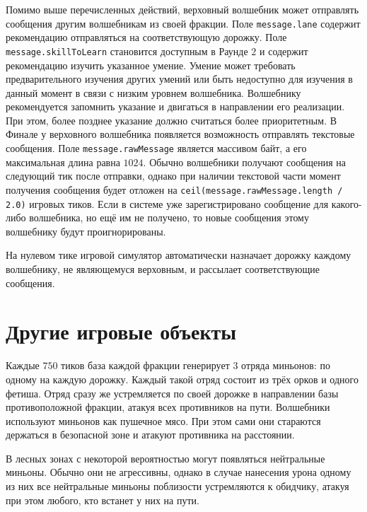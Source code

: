 
Помимо выше перечисленных действий, верховный волшебник может отправлять сообщения другим волшебникам из своей фракции. Поле
\texttt{message.lane} содержит рекомендацию отправляться на соответствующую дорожку. Поле \texttt{message.skillToLearn} становится доступным
в Раунде $2$ и содержит рекомендацию изучить указанное умение. Умение может требовать предварительного изучения других умений или быть
недоступно для изучения в данный момент в связи с низким уровнем волшебника. Волшебнику рекомендуется запомнить указание и двигаться в
направлении его реализации. При этом, более позднее указание должно считаться более приоритетным. В Финале у верховного волшебника
появляется возможность отправлять текстовые сообщения. Поле \texttt{message.rawMessage} является массивом байт, а его максимальная длина
равна $1024$. Обычно волшебники получают сообщения на следующий тик после отправки, однако при наличии текстовой части момент получения
сообщения будет отложен на \texttt{ceil(message.rawMessage.length / 2.0)} игровых тиков. Если в системе уже зарегистрировано сообщение для
какого-либо волшебника, но ещё им не получено, то новые сообщения этому волшебнику будут проигнорированы.

На нулевом тике игровой симулятор автоматически назначает дорожку каждому волшебнику, не являющемуся верховным, и рассылает соответствующие
сообщения.

\section{Другие игровые объекты}

Каждые $750$ тиков база каждой фракции генерирует $3$ отряда миньонов: по одному на каждую дорожку. Каждый такой отряд состоит из трёх орков
и одного фетиша. Отряд сразу же устремляется по своей дорожке в направлении базы противоположной фракции, атакуя всех противников на пути.
Волшебники используют миньонов как пушечное мясо. При этом сами они стараются держаться в безопасной зоне и атакуют противника на
расстоянии.

В лесных зонах с некоторой вероятностью могут появляться нейтральные миньоны. Обычно они не агрессивны, однако в случае нанесения урона
одному из них все нейтральные миньоны поблизости устремляются к обидчику, атакуя при этом любого, кто встанет у них на пути.

